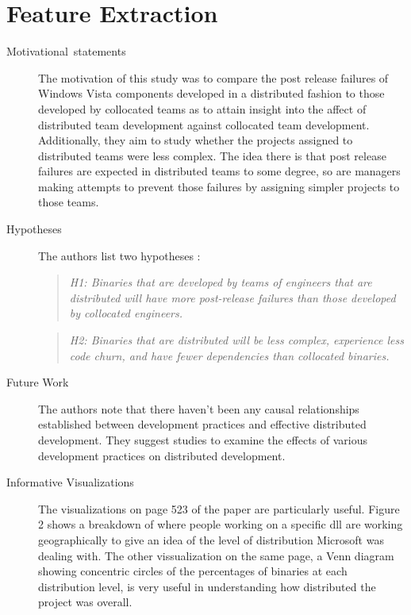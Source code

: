 \documentclass[english]{article}
\begin{document}
\section*{Feature Extraction}
\begin{description}
\item [{Motivational~statements}] The motivation of this study was to compare the post release failures of Windows Vista components developed in a distributed fashion to those developed by collocated teams as to attain insight into the affect of distributed team development against collocated team development.  Additionally, they aim to study whether the projects assigned to distributed teams were less complex.  The idea there is that post release failures are expected in distributed teams to some degree, so are managers making attempts to prevent those failures by assigning simpler projects to those teams.
\item[Hypotheses] The authors list two hypotheses \cite{bird09}: 
\begin{quote}
\emph{H1: Binaries that are developed by teams of engineers that are distributed will have more post-release failures than those developed by collocated engineers.}
\end{quote}
\begin{quote}
\emph{H2: Binaries that are distributed will be less complex, experience less code churn, and have fewer dependencies than collocated binaries.}
\end{quote}
\item[Future Work] The authors note that there haven't been any causal relationships established between development practices and effective distributed development. They suggest studies to examine the effects of various development practices on distributed development.
\item[Informative Visualizations] The visualizations on page 523 of the paper are particularly useful.  Figure 2 shows a breakdown of where people working on a specific dll are working geographically to give an idea of the level of distribution Microsoft was dealing with.  The other vissualization on the same page, a Venn diagram showing concentric circles of the percentages of binaries at each distribution level, is very useful in understanding how distributed the project was overall.
\end{description}
\end{document}
